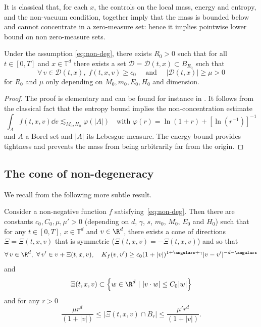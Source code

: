 It is classical that, for each $x$, the controls on the local mass,
energy and entropy, and the non-vacuum condition, together imply that
the mass is bounded below and cannot concentrate in a zero-measure
set: hence it implies pointwise lower bound on non zero-measure sets.

\begin{lemma} \label{lem:D} Under the assumption \eqref{eq:non-deg},
there exists $R_0>0$ such that for all $t \in [0,T]$ and
$x \in \mathbb{T}^d$ there exists a set
$\mathcal{D} = \mathcal{D}(t,x) \subset B_{R_0}$ such that
\[ \forall \, v \in \mathcal{D}(t,x), \; f(t,x,v) \ge c_0 \quad \text{ and } \quad
|\mathcal{D}(t,x)| \ge \mu >0 \]
for $R_0$ and $\mu$ only depending on $M_0,m_0,E_0,H_0$ and
dimension.
\end{lemma}

\begin{proof}
The proof is elementary and can be found for instance in
\cite[Lem.\,4.6]{luis}. It follows from the classical fact that the
entropy bound implies the non-concentration estimate
\[
\int_A f(t,x,v) \dd v \lesssim_{M_0,H_0} \varphi(|A|) \quad \mbox{
with } \varphi(r) = \ln(1+r) + \left[ \ln\left(r^{-1}\right) \right]^{-1}
\]
and $A$ a Borel set and $|A|$ its Lebesgue measure. The energy bound
provides tightness and prevents the mass from being arbitrarily far
from the origin.
\end{proof}

\subsection{The cone of non-degeneracy}

We recall from \cite{luis,is} the following more subtle result.

\begin{lemma}\label{lem:cone-nd}
Consider a non-negative function $f$
satisfying~\eqref{eq:non-deg}. Then there are constants
$c_0,C_0,\mu, \mu'>0$ (depending on $d$, $\gamma$, $s$, $m_0$,
$M_0$, $E_0$ and $H_0$) such that for any $t \in [0,T]$,
$x \in \mathbb T^d$ and $v \in \R^d$, there exists a cone of
directions $\Xi = \Xi(t,x,v)$ that is symmetric
(\ie $\Xi(t,x,v) = -\Xi(t,x,v)$) and so that
\[
\forall \, v \in \R^d, \ \forall \, v' \in v+\Xi(t,x,v), \quad K_f(v,v') \geq c_0 (1+|v|)^{1+\angulars+\gamma}
|v-v'|^{-d-\angulars}
\]
and
\[
\Xi(t,x,v) \subset \left\{ w \in \R^d \ | \ |v \cdot w| \le C_0
|w|\right\}
\]
and for any $r >0$
\begin{equation}\label{eq:cone-estim}
\frac{\mu r^d}{(1+|v|)} \le \left|\Xi(t,x,v) \cap B_r\right| \le
\frac{\mu' r^d}{(1+|v|)}.
\end{equation}
\end{lemma}

